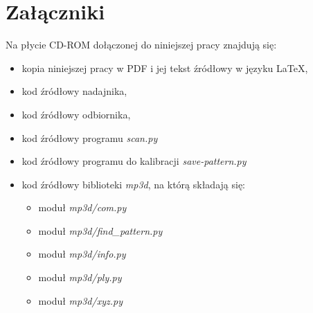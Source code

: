 \appendix
\chapter{Załączniki}

Na płycie CD-ROM dołączonej do niniejszej pracy znajdują się:
\begin{itemize}
 \item kopia niniejszej pracy w PDF i jej tekst źródłowy w języku \LaTeX,
 \item kod źródłowy nadajnika,
 \item kod źródłowy odbiornika,
 \item kod źródłowy programu \textit{scan.py} 
 \item kod źródłowy programu do kalibracji \textit{save-pattern.py}
 \item kod źródłowy biblioteki \textit{mp3d}, na którą składają się:
  \begin{itemize}
    \item moduł \textit{mp3d/com.py}
    \item moduł \textit{mp3d/find\_pattern.py}
    \item moduł \textit{mp3d/info.py}
    \item moduł \textit{mp3d/ply.py}
    \item moduł \textit{mp3d/xyz.py}
  \end{itemize} 
\end{itemize}

